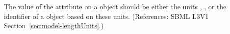 The value of the attribute  on a \Model object should be
either the units , , or the identifier of a
\UnitDefinition object based on these units.  (References: SBML L3V1
Section~\ref{sec:model-lengthUnits}.)
